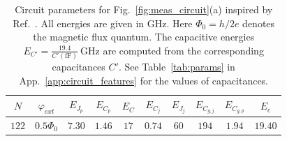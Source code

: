 \documentclass[%
reprint,
superscriptaddress,
 amsmath,amssymb,
 aps,
 prx,
longbibliography,
floatfix,
]{revtex4-2}
\begin{document}
\renewcommand{\arraystretch}{1.5} %
\begin{table}[htb]
\centering
\begin{tabular}{|c|c|c|c|c|c|c|c|c|c|}
    \hline
     $N$ & $\varphi_{ext}$ & $E_{J_p}$ & $E_{C_p}$ & $E_C$ & $E_{C_j}$ & $E_{J_j}$ & $E_{C_{g,j}}$ & $E_{C_{g,p}}$ & $E_c$ \\
    \hline
    $122$ & $0.5\Phi_0$ & $7.30$ & $1.46$ & $17$ & $0.74$ & $60$ & $194$ & $1.94$ & $19.40$ \\
    \hline
\end{tabular}
\caption{Circuit parameters for Fig.~\ref{fig:meas_circuit}(a) inspired by Ref.~\cite{zhang_universal_2021}. All energies are given in GHz. Here $\Phi_0=h/2e$ denotes the magnetic flux quantum. The capacitive energies $E_{C'}=\frac{19.4}{{C'}(\mathrm{fF})} \ \mathrm{GHz}$ are computed from the corresponding capacitances $C'$. See Table~\ref{tab:params} in App.~\ref{app:circuit_features} for the values of capacitances.}
\label{tab:circuit_params}
\end{table}







\renewcommand{\arraystretch}{1.5} %
\end{document}
